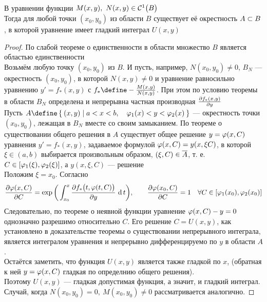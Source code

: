 \begin{theorem}
    \hfill \\
    В уравнении  функции $ M(x, y), ~ N(x, y) \in \Cont[1]B $ \\
    Тогда для любой точки $ (x_0, y_0) $ из области $ B $ существует её окрестность $ A \sub B $, в которой уравнение  имеет гладкий интеграл $ U(x, y) $
\end{theorem}

\begin{proof}
	По слабой теореме о единственности в области множество $ B $ является областью единственности \\
    Возьмём любую точку $ (x_0, y_0) $ из $ B $. И пусть, например, $ N(x_0, y_0) \ne 0 $, $ B_N $ --- окрестность $ (x_0, y_0) $, в которой $ N(x, y) \ne 0 $ и уравнение  равносильно уравнению $ y' = f_*(x, y) $ с $ f_* \define - \frac{M(x, y)}{N(x, y)} $. При этом по условию теоремы в области $ B_N $ определена и непрерывна частная производная $ \pder{f_*(x, y)}y $ \\
    Пусть $ A \define \set{(x, y) | a < x < b, \quad \vphi_1(x) < y < \vphi_2(x)} $ --- окрестность точки $ (x_0, y_0) $, лежащая в $ B_N $ вместе со своим замыканием. По теореме о существовании общего решения в $ A $ существует общее решение $ y = \vphi(x, C) $ уравнения $ y' = f_*(x, y) $, задаваемое формулой  $ \vphi(x, C) = y(x, \xi C) $, в которой $ \xi \in (a, b) $ выбирается произвольным образом, $ (\xi, C) \in \ol{A} $, т. е. $ C \in [\vphi_1(\xi), \vphi_2(\xi)] $, а $ y(x, \xi, C) $ --- решение  \\
    Положим $ \xi = x_0 $. Согласно 
    $$ \pder{\vphi(x, C)}C = \exp \bigg( \dint[t]{x_0}x{\pder{f_* \big( t, \vphi(t, C) \big)}y} \bigg), \qquad \pder{\vphi(x_0, C)}C = 1 \quad \forall C \in [\vphi_1(x_0), \vphi_2(x_0)] $$
    Следовательно, по теореме о неявной функции уравнение $ \vphi(x, C) - y = 0 $ однозначно разрешимо относительно $ C $. Его решение $ C = U(x, y) $, как установлено в доказательстве теоремы о существовании непрерывного интеграла, является интегралом уравнения  и непрерывно дифференцируемо по $ y $ в области $ A $. \\
    Остаётся заметить, что функция $ U(x, y) $ является также гладкой по $ x $, (\as обратная к ней $ y = \vphi(x, C) $ гладкая по определнию общего решения). \\
    Поэтому $ U(x, y) $ --- гладкая допустимая функция, а значит, и гладкий интеграл. \\
    Случай, когда $ N(x_0, y_0) = 0, ~ M(x_0, y_0) \ne 0 $ рассматривается аналогично.
\end{proof}

